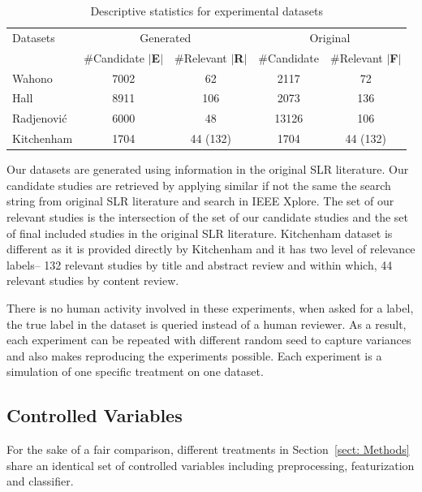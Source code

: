 \documentclass{svjour3}
\theoremstyle{break}
\begin{document}
\begin{table}
\caption{Descriptive statistics for experimental datasets}
\label{tab: number}
\begin{center}
\begin{tabular}{ |l|c|c|c|c| }
  \hline
   Datasets & \multicolumn{2}{|c|}{Generated} & \multicolumn{2}{|c|}{Original} \\
  \cline{2-5}
  & \#Candidate $|$\textbf{E}$|$ & \#Relevant $|$\textbf{R}$|$& \#Candidate & \#Relevant $|$\textbf{F}$|$\\
  \hline
  Wahono & 7002 & 62 & 2117 & 72\\
  \hline
  Hall & 8911 & 106 & 2073 & 136 \\
  \hline
  Radjenovi{\'c} & 6000 & 48 & 13126 & 106\\
  \hline
  Kitchenham & 1704 & 44 (132) & 1704 & 44 (132) \\
  \hline
\end{tabular}
\end{center}
{\footnotesize Our datasets are generated using information in the original SLR literature. Our candidate studies are retrieved by applying similar if not the same the search string from original SLR literature and search in IEEE Xplore. The set of our relevant studies is the intersection of the set of our candidate studies and the set of final included studies in the original SLR literature. Kitchenham dataset is different as it is provided directly by Kitchenham and it has two level of relevance labels-- 132 relevant studies by title and abstract review and within which, 44 relevant studies by content review.}
\end{table}

There is no human activity involved in these experiments, when asked for a label, the true label in the dataset is queried instead of a human reviewer. As a result, each experiment can be repeated with different random seed to capture variances and also makes reproducing the experiments possible. Each experiment is a simulation of one specific treatment on one dataset.

\subsection{Controlled Variables}
\label{sect: Controlled Variables}

For the sake of a fair comparison, different treatments in Section~\ref{sect: Methods} share an identical set of controlled variables including preprocessing, featurization and classifier. 
\end{document}
